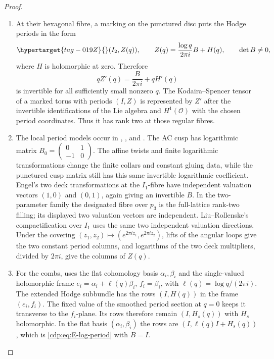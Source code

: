 \begin{proof}

\begin{enumerate}[label=\arabic*.,leftmargin=*]
\item At their hexagonal fibre, a marking on the punctured disc puts
the Hodge periods in the form
\begin{equation}\hypertarget{tag-019Z}{}\label{cdp:eq:E-log-period}
  (I_2,Z(q)),\qquad
 Z(q)=\frac{\log q}{2\pi i}B+H(q),
 \qquad \det B\ne0,
\end{equation}
where $H$ is holomorphic at zero. Therefore
\[
 qZ'(q)=\frac{B}{2\pi i}+qH'(q)
\]
is invertible for all sufficiently small nonzero $q$. The
Kodaira--Spencer tensor of a marked torus with periods $(I,Z)$
is represented by $Z'$ after the invertible identifications of
the Lie algebra and $H^1(\mathcal O)$ with the chosen period
coordinates. Thus it has rank two at those regular fibres.

\item The local period models occur in
\cite[Proposition~6.1]{Viaclovsky2026Combs},
\cite[Proposition~3.1]{Viaclovsky2026Two}, and
\cite[Proposition~2.5]{LiuRollenske2026}.
The AC cusp has logarithmic matrix
$B_0=\left(\begin{smallmatrix}0&1\\-1&0\end{smallmatrix}\right)$.
The affine twists and finite logarithmic transformations change
the finite collars and constant gluing data, while the punctured
cusp matrix still has this same invertible logarithmic coefficient.
Engel's two deck transformations at the $I_1$-fibre have independent
valuation vectors $(1,0)$ and $(0,1)$, again giving an invertible
$B$. In the two-parameter family the designated fibre over $p_3$
is the full-lattice rank-two filling; its displayed two valuation
vectors are independent. Liu--Rollenske's compactification over
$I_1$ uses the same two independent valuation directions. Under the covering
$(z_1,z_2)\mapsto(e^{2\pi iz_1},e^{2\pi iz_2})$, lifts of the
angular loops give the two constant period columns, and logarithms
of the two deck multipliers, divided by $2\pi i$, give the columns of $Z(q)$.

\item For the combs, \cite[Proposition~4.1, case~(i)]{Viaclovsky2026Combs}
uses the flat cohomology basis $\alpha_i,\beta_i$ and the
single-valued holomorphic frame
$e_i=\alpha_i+\ell(q)\beta_i$, $f_i=\beta_i$, with
$\ell(q)=\log q/(2\pi i)$. The extended Hodge subbundle has
the rows $(I,H(q))$ in the frame $(e_i,f_i)$. The fixed value of the
smoothed period section at $q=0$ keeps it transverse to the
$f_i$-plane. Its rows therefore remain $(I,H_s(q))$ with
$H_s$ holomorphic. In the flat basis $(\alpha_i,\beta_i)$ the rows are
$(I,\ell(q)I+H_s(q))$, which is \eqref{cdp:eq:E-log-period} with
$B=I$.


\end{enumerate}
\end{proof}
